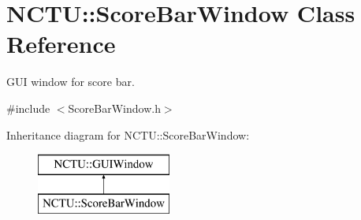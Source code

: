\hypertarget{class_n_c_t_u_1_1_score_bar_window}{}\section{N\+C\+TU\+:\+:Score\+Bar\+Window Class Reference}
\label{class_n_c_t_u_1_1_score_bar_window}


G\+UI window for score bar.  




{\ttfamily \#include $<$Score\+Bar\+Window.\+h$>$}

Inheritance diagram for N\+C\+TU\+:\+:Score\+Bar\+Window\+:\begin{figure}[H]
\begin{center}
\leavevmode
\includegraphics[height=2.000000cm]{class_n_c_t_u_1_1_score_bar_window}
\end{center}
\end{figure}
